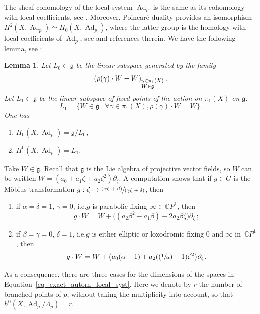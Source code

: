 \documentclass[10pt]{amsart}
\newcommand{\ie}{i.e.}
\newcommand\mto{\mathchoice{\longmapsto}{\mapsto}{\mapsto}{\mapsto}}
\newcommand{\Psfrac}[2]{(\sfrac{#1}{#2})}
\newcommand{\pspfrac}[2]{\sfrac{(#1)}{(#2)}}
\newcommand{\CP}{\mathbb CP}
\DeclareMathOperator{\Ad}{Ad}
\theoremstyle{definition}
\theoremstyle{plain}
\newtheorem{lemma}[definition]{Lemma}
\begin{document}
The sheaf cohomology of the local system $\Ad_p$ is the same as its cohomology with local coefficients, see \cite{steenrod}.
Moreover, Poincaré duality provides an isomorphism $H^2\left(X, \Ad_p\right) \simeq H_0\left(X, \Ad_p\right)$, where the latter group is the homology with local coefficients of $\Ad_p$, see \cite{sun} and references therein.
We have the following lemma, see \cite{whitehead}:

\begin{lemma}
Let $L_0 \subset \mathfrak g$ be the linear subspace generated by the family
\[
\left(\rho(\gamma)\cdot W - W\right)_{\begin{subarray}{1}\gamma \in \pi_1(X) \\ W \in \mathfrak g \end{subarray}}.
\]
Let $L_1 \subset \mathfrak g$ be the linear subspace of fixed points of the action on $\pi_1(X)$ on $\mathfrak g$:
\[
L_1 = \{W \in \mathfrak g \mid \forall \gamma \in \pi_1(X), \rho(\gamma) \cdot W = W\}.
\]
One has
\begin{enumerate}
\item
$H_0\left(X, \Ad_p\right) = \mathfrak g / L_0$,
\item
$H^0\left(X, \Ad_p\right) = L_1$.
\end{enumerate}
\end{lemma}
Take $W \in \mathfrak g$.
Recall that $\mathfrak g$ is the Lie algebra of projective vector fields, so $W$ can be written $W = \left(a_0 + a_1 \zeta + a_2 \zeta^2 \right) \partial_{\zeta}$.
A computation shows that if $g \in G$ is the Möbius transformation $g: \zeta \mto \pspfrac{\alpha \zeta + \beta}{\gamma \zeta + \delta}$, then
\begin{enumerate}
\item
if $\alpha = \delta = 1$, $\gamma = 0$, \ie $g$ is parabolic fixing $\infty \in \CP^1$, then
\[
g \cdot W = W + \bigl((a_2 \beta^2 - a_1 \beta) - 2a_2 \beta \zeta\bigr) \partial_{\zeta}\,;
\]
\item
if $\beta \!=\! \gamma \!=\! 0$, $\delta \!=\! 1$, \ie $g$ is either elliptic or loxodromic fixing $0$ and $\infty$ in~$\CP^1$, then
\[
g \cdot W = W + \bigl(a_0(\alpha-1) + a_2(\Psfrac{1}{\alpha} - 1)\zeta^2\bigr)\partial_{\zeta}.
\]
\end{enumerate}
As a consequence, there are three cases for the dimensions of the spaces in Equation~\eqref{eq_exact_autom_local_syst}.
Here we denote by $r$ the number of branched points of $p$, without taking the multiplicity into account, so that $h^0\left(X, \Ad_p / \Lambda_p\right) = r$.
\end{document}
